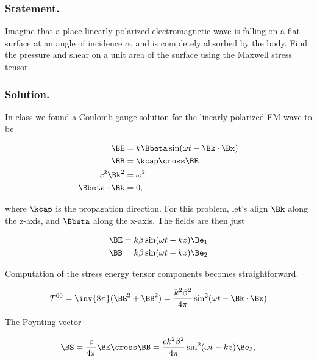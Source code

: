 \subsubsection{Statement.}

Imagine that a place linearly polarized electromagnetic wave is falling on a flat surface at an angle of incidence $\alpha$, and is completely absorbed by the body.  Find the pressure and shear on a unit area of the surface using the Maxwell stress tensor.

\subsubsection{Solution.}

In class we found a Coulomb gauge solution for the linearly polarized EM wave to be

\begin{align}\label{eqn:relativisticElectrodynamicsPS6P1:n}
\BE &= k \Bbeta \sin( \omega t - \Bk \cdot \Bx ) \\
\BB &= \kcap \cross \BE \\
c^2 \Bk^2 &= \omega^2 \\
\Bbeta \cdot \Bk &= 0,
\end{align}

where $\kcap$ is the propagation direction.  For this problem, let's align $\Bk$ along the z-axis, and $\Bbeta$ along the x-axis.  The fields are then just

\begin{align}\label{eqn:relativisticElectrodynamicsPS6P1:n}
\BE &= k \beta \sin( \omega t - k z ) \Be_1 \\
\BB &= k \beta \sin( \omega t - k z ) \Be_2 
\end{align}

Computation of the stress energy tensor components becomes straightforward.

\begin{equation}\label{eqn:relativisticElectrodynamicsPS6P1:n}
T^{0 0} = \inv{8 \pi} (\BE^2 + \BB^2) = \frac{k^2 \beta^2}{4 \pi} \sin^2(\omega t - \Bk \cdot \Bx)
\end{equation}

The Poynting vector

\begin{equation}\label{eqn:relativisticElectrodynamicsPS6P1:n}
\BS = \frac{c}{4 \pi} \BE \cross \BB = \frac{c k^2 \beta^2}{4 \pi} \sin^2(\omega t - k z) \Be_3,
\end{equation}

